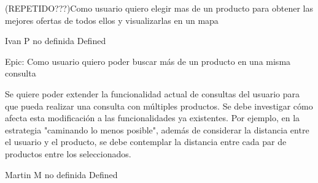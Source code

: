 \vspace{20pt}

	{(REPETIDO???)Como usuario quiero elegir mas de un producto para obtener las mejores ofertas de todos ellos y visualizarlas en un mapa} %
	{

} %
	{} %
	{} %
	{Ivan P} %
	{no definida} %
	{Defined} %


\vspace{20pt}

	{Epic: Como usuario quiero poder buscar más de un producto en una misma consulta} %
	{Se quiere poder extender la funcionalidad actual de consultas del usuario para
que pueda realizar una consulta con múltiples productos. Se debe investigar
cómo afecta esta modificación a las funcionalidades ya existentes. Por
ejemplo, en la estrategia "caminando lo menos posible", además de considerar
la distancia entre el usuario y el producto, se debe contemplar la distancia
entre cada par de productos entre los seleccionados.

} %
	{} %
	{} %
	{Martin M} %
	{no definida} %
	{Defined} %


\vspace{20pt}


